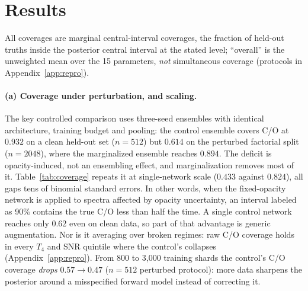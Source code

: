 \documentclass{article}
\begin{document}
\section{Results}
\label{sec:results}

All coverages are marginal central-interval coverages, the fraction of held-out
truths inside the posterior central interval at the stated level; ``overall'' is
the unweighted mean over the 15 parameters, \emph{not} simultaneous coverage (protocols in Appendix~\ref{app:repro}).

\paragraph{(a) Coverage under perturbation, and scaling.}
The key controlled comparison uses three-seed ensembles with identical
architecture, training budget and pooling: the control ensemble covers C/O at
$0.932$ on a clean held-out set ($n=512$) but $0.614$ on the perturbed
factorial split ($n=2048$), where the marginalized ensemble reaches $0.894$.
The deficit is opacity-induced, not an ensembling effect, and marginalization
removes most of it.
Table~\ref{tab:coverage} repeats it at single-network scale ($0.433$ against
$0.824$), all gaps tens of binomial standard errors. In other words, when the
fixed-opacity network is applied to spectra affected by opacity uncertainty, an
interval labeled as 90\% contains the true C/O less than half the time. A single
control network reaches only $0.62$ even on clean data, so part of that advantage
is generic augmentation. Nor is it averaging over broken regimes: raw C/O coverage holds in every $T_4$
and SNR quintile where the control's collapses (Appendix~\ref{app:repro}). From 800 to 3{,}000 training shards the
control's C/O coverage \emph{drops} $0.57\to0.47$ ($n=512$ perturbed
protocol): more data sharpens the posterior
around a misspecified forward model instead of correcting it.
\end{document}
